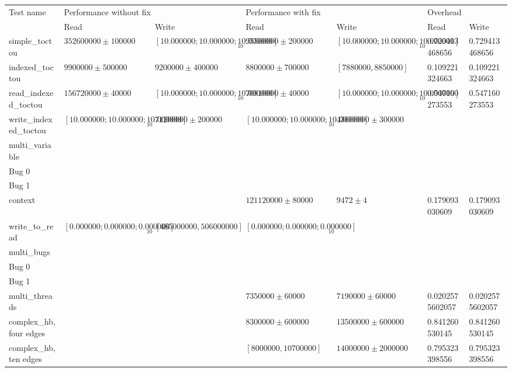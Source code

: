 \begin{tabular}{lllllll}
Test name              & \multicolumn{2}{l}{Performance without fix} & \multicolumn{2}{l}{Performance with fix} & \multicolumn{2}{l}{Overhead}\\
                       & Read & Write                                & Read & Write                             & Read & Write \\
\hline
\hline{}simple\_toctou       & $352600000 \pm 100000$ & $[10.000000; 10.000000; 10.000000]_{10}$ & $95500000 \pm 200000$ & $[10.000000; 10.000000; 10.000000]_{10}$ & 0.729413468656
 & 0.729413468656
\\
\hline{}indexed\_toctou      & $9900000 \pm 500000$ & $9200000 \pm 400000$ & $8800000 \pm 700000$ & $[7880000, 8850000]$ & 0.109221324663
 & 0.109221324663
\\
\hline{}read\_indexed\_toctou & $156720000 \pm 40000$ & $[10.000000; 10.000000; 10.000000]_{10}$ & $70810000 \pm 40000$ & $[10.000000; 10.000000; 10.000000]_{10}$ & 0.547160273553
 & 0.547160273553
\\
\hline{}write\_indexed\_toctou & $[10.000000; 10.000000; 10.000000]_{10}$ & $71200000 \pm 200000$ & $[10.000000; 10.000000; 10.000000]_{10}$ & $43600000 \pm 300000$ &  & \\
\hline{}multi\_variable      &                      &                      & \\
\hspace{20pt}Bug 0  & & &                      &                      &  & \\
\hspace{20pt}Bug 1  & & &                      &                      &  & \\
\hline{}context              &                      &                      & $121120000 \pm 80000$ & $9472 \pm 4$         & 0.179093030609
 & 0.179093030609
\\
\hline{}write\_to\_read      & $[0.000000; 0.000000; 0.000000]_{10}$ & $[485000000, 506000000]$ & $[0.000000; 0.000000; 0.000000]_{10}$ &                      &  & \\
\hline{}multi\_bugs          &                      &                      & \\
\hspace{20pt}Bug 0  & & &                      &                      &  & \\
\hspace{20pt}Bug 1  & & &                      &                      &  & \\
\hline{}multi\_threads       &                      &                      & $7350000 \pm 60000$  & $7190000 \pm 60000$  & 0.0202575602057
 & 0.0202575602057
\\
\hline{}complex\_hb, four edges &                      &                      & $8300000 \pm 600000$ & $13500000 \pm 600000$ & 0.841260530145
 & 0.841260530145
\\
\hline{}complex\_hb, ten edges &                      &                      & $[8000000, 10700000]$ & $14000000 \pm 2000000$ & 0.795323398556
 & 0.795323398556
\\
\end{tabular}
